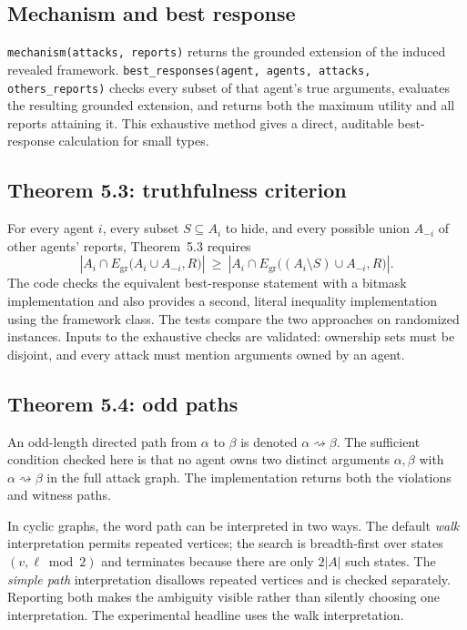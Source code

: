 \documentclass[11pt,a4paper]{article}
\newcommand{\Grounded}{E_{\mathrm{gr}}}
\newcommand{\code}[1]{\texttt{\small #1}}
\begin{document}
\subsection{Mechanism and best response}
\code{mechanism(attacks, reports)} returns the grounded extension of the induced revealed framework. \code{best\_responses(agent, agents, attacks, others\_reports)} checks every subset of that agent's true arguments, evaluates the resulting grounded extension, and returns both the maximum utility and all reports attaining it. This exhaustive method gives a direct, auditable best-response calculation for small types.

\subsection{Theorem 5.3: truthfulness criterion}
For every agent $i$, every subset $S\subseteq A_i$ to hide, and every possible union $A_{-i}$ of other agents' reports, Theorem~5.3 requires
\[
\left|A_i\cap\Grounded\bigl(A_i\cup A_{-i},R\bigr)\right|
\ \geq\
\left|A_i\cap\Grounded\bigl((A_i\setminus S)\cup A_{-i},R\bigr)\right|.
\tag{1}\label{eq:theorem53}
\]
The code checks the equivalent best-response statement with a bitmask implementation and also provides a second, literal inequality implementation using the framework class. The tests compare the two approaches on randomized instances. Inputs to the exhaustive checks are validated: ownership sets must be disjoint, and every attack must mention arguments owned by an agent.

\subsection{Theorem 5.4: odd paths}
An odd-length directed path from $\alpha$ to $\beta$ is denoted $\alpha\rightsquigarrow\beta$. The sufficient condition checked here is that no agent owns two distinct arguments $\alpha,\beta$ with $\alpha\rightsquigarrow\beta$ in the full attack graph. The implementation returns both the violations and witness paths.

In cyclic graphs, the word path can be interpreted in two ways. The default \emph{walk} interpretation permits repeated vertices; the search is breadth-first over states $(v,\ell\bmod 2)$ and terminates because there are only $2|A|$ such states. The \emph{simple path} interpretation disallows repeated vertices and is checked separately. Reporting both makes the ambiguity visible rather than silently choosing one interpretation. The experimental headline uses the walk interpretation.
\end{document}
